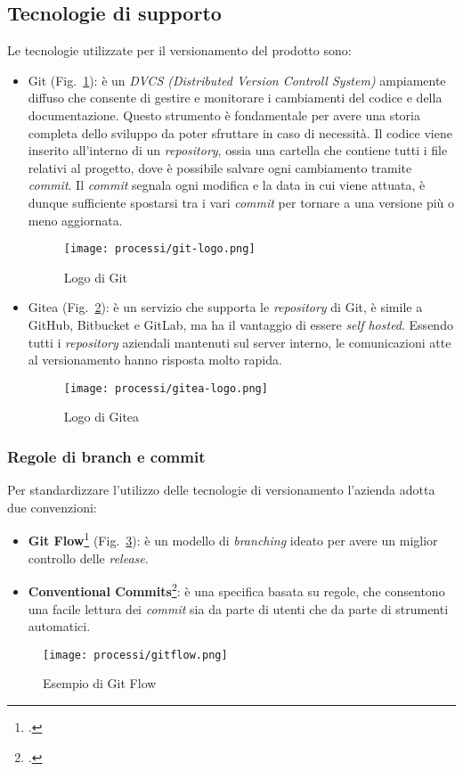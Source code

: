 \subsection{Tecnologie di supporto}
Le tecnologie utilizzate per il versionamento del prodotto sono:
\begin{itemize}
    \item Git (Fig.~\ref{fig:logo-git}): è un \emph{DVCS (Distributed Version Controll System)} ampiamente diffuso che consente di gestire e monitorare i cambiamenti del codice e della documentazione. Questo strumento è fondamentale per avere una storia completa dello sviluppo da poter sfruttare in caso di necessità. Il codice viene inserito all'interno di un \emph{repository}, ossia una cartella che contiene tutti i file relativi al progetto, dove è possibile salvare ogni cambiamento tramite \emph{commit}. Il \emph{commit} segnala ogni modifica e la data in cui viene attuata, è dunque sufficiente spostarsi tra i vari \emph{commit} per tornare a una versione più o meno aggiornata.  
    
    \begin{figure}[!h] 
        \centering 
        \texttt{[image: processi/git-logo.png]} 
        \caption{Logo di Git}
        \label{fig:logo-git}
      \end{figure}

    \item Gitea (Fig.~\ref{fig:logo-gitea}): è un servizio che supporta le \emph{repository} di Git, è simile a GitHub, Bitbucket e GitLab, ma ha il vantaggio di essere \emph{\gls{self hosted}}\glsfirstoccur. 
    Essendo tutti i \emph{repository} aziendali mantenuti sul server interno, le comunicazioni atte al versionamento hanno risposta molto rapida.

    \begin{figure}[!h] 
        \centering 
        \texttt{[image: processi/gitea-logo.png]} 
        \caption{Logo di Gitea}
        \label{fig:logo-gitea}
      \end{figure}
\end{itemize}

\subsubsection{Regole di branch e commit}
Per standardizzare l'utilizzo delle tecnologie di versionamento l'azienda adotta due convenzioni:
\begin{itemize}
    \item \textbf{Git Flow}\footcite{site:gitflow} (Fig.~\ref{fig:schema-gitflow}): è un modello di \emph{branching} ideato per avere un miglior controllo delle \emph{release}.
    \item \textbf{Conventional Commits}\footcite{site:commits}: è una specifica basata su regole, che consentono una facile lettura dei \emph{commit} sia da parte di utenti che da parte di strumenti automatici. 
\end{itemize}

\begin{figure}[!h] 
    \centering 
    \texttt{[image: processi/gitflow.png]} 
    \caption{Esempio di Git Flow}
    \label{fig:schema-gitflow}
  \end{figure}

  